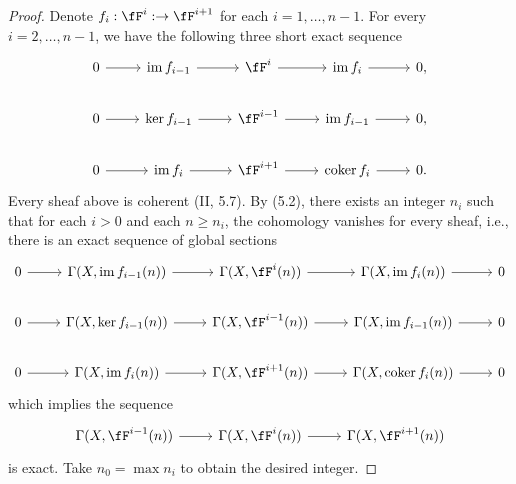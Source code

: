 \documentclass[a4paper]{article}
\begin{document}
\begin{enumerate} [label=\textbf{\arabic*.}, leftmargin=0em]
        \begin{proof}
          Denote $f_i : \fF^i : \to \fF^{i + 1}$ for each $i = 1, \dots, n - 1$.
          For every $i = 2, \dots, n-1$, we have the following three short exact sequence
          \[ \begin{tikzcd}
              0 \arrow[r] & \im{f_{i - 1}} \arrow[r]  & \fF^i \arrow[r]       & \im{f_{i}} \arrow[r]   & 0, \\
              0 \arrow[r] & \ker{f_{i - 1}} \arrow[r] & \fF^{i - 1} \arrow[r] & \im{f_{i-1}} \arrow[r] & 0, \\
              0 \arrow[r] & \im{f_i} \arrow[r]        & \fF^{i + 1} \arrow[r]       & \coker{f_i} \arrow[r]  & 0.
            \end{tikzcd} \]
          Every sheaf above is coherent (II, 5.7).
          By (5.2), there exists an integer $n_i$ such that for each $i > 0$ and each $n \geq n_i$, the cohomology vanishes for every sheaf, i.e., there is an exact sequence of global sections
          \[ \begin{tikzcd}
              0 \arrow[r] & \gsecx{\im{f_{i - 1}}(n)} \arrow[r]  & \gsecx{\fF^i(n)} \arrow[r]       & \gsecx{\im{f_{i}}(n)} \arrow[r]   & 0 \\
              0 \arrow[r] & \gsecx{\ker{f_{i - 1}}(n)} \arrow[r] & \gsecx{\fF^{i - 1}(n)} \arrow[r] & \gsecx{\im{f_{i-1}}(n)} \arrow[r] & 0 \\
              0 \arrow[r] & \gsecx{\im{f_i}(n)} \arrow[r]        & \gsecx{\fF^{i + 1}(n)} \arrow[r]       & \gsecx{\coker{f_i}(n)} \arrow[r]  & 0
            \end{tikzcd} \]
          which implies the sequence
          \[ \begin{tikzcd}
              \gsecx{\fF^{i - 1}(n)} \arrow[r] & \gsecx{\fF^{i}(n)} \arrow[r] & \gsecx{\fF^{i + 1}(n)}
            \end{tikzcd} \]
          is exact.
          Take $n_0 = \max{n_i}$ to obtain the desired integer.
        \end{proof}

\end{enumerate}
\end{document}
